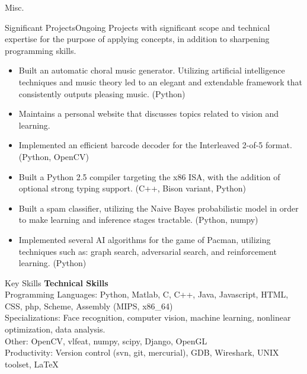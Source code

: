 \documentclass{resume}
\begin{document}
\begin{component}{Misc.}
	\begin{position}{Significant Projects}{Ongoing}
		{}{\vspace{-1.0em}}
	{Projects with significant scope and technical expertise for the purpose of applying concepts, in addition to
	sharpening programming skills.}

	\begin{itemize}
		\vspace{-0.5em}\item Built an automatic choral music generator. Utilizing artificial intelligence techniques and music theory led to an elegant and extendable framework that consistently outputs pleasing music.
		(Python)
        \vspace{-0.5em}\item Maintains a personal website that discusses topics related to vision and learning.
        \vspace{-0.5em}\item Implemented an efficient barcode decoder
        for the Interleaved 2-of-5 format. (Python, OpenCV)
		\vspace{-0.5em}\item Built a Python 2.5 compiler targeting the x86 ISA, with the addition of
		optional strong typing support. (C++, Bison variant, Python)
		\vspace{-0.5em}\item Built a spam classifier, utilizing the Naive Bayes probabilistic model in order to make
		learning and inference stages tractable. (Python, numpy)
		\vspace{-0.5em}\item Implemented several AI algorithms for the game of Pacman, utilizing
		techniques such as: graph search, adversarial search, and reinforcement learning. (Python)
	\end{itemize}
	\end{position}
\end{component}

\vspace{-2.0em}

\begin{component}{Key Skills}
	\textbf{Technical Skills}\\
		Programming Languages: Python, Matlab, C, C++, Java, Javascript, HTML, CSS, php, Scheme, Assembly (MIPS, x86\_64)\\
        Specializations: Face recognition, computer vision, machine learning, nonlinear optimization, data analysis.\\
		Other: OpenCV, vlfeat, numpy, scipy, Django, OpenGL \\
		Productivity: Version control (svn, git, mercurial), GDB, Wireshark, UNIX toolset, LaTeX
\end{component}
\end{document}
